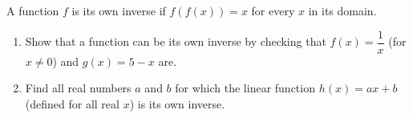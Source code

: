 A function $f$ is its own inverse if $f(f(x))=x$ for every $x$ in its domain.
\begin{enumerate}
\item[(a)] Show that a function can be its own inverse by checking that $f(x)=\dfrac{1}{x}$ (for $x\ne0$) and $g(x)=5-x$ are.
\item[(b)] Find all real numbers $a$ and $b$ for which the linear function $h(x)=ax+b$ (defined for all real $x$) is its own inverse.
\end{enumerate}
